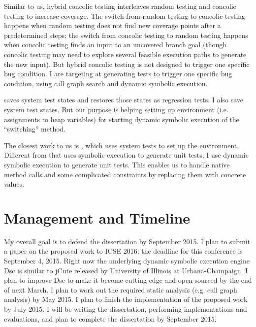 \documentclass[proposal]{umthesis} %
\begin{document}
Similar to us, hybrid concolic testing\cite{Majumdar:2007:HCT:1248820.1248874} interleaves random testing and concolic testing to increase coverage.  The switch from random testing to concolic testing happens when random testing does not find new coverage points after a predetermined steps; the switch from concolic testing to random testing happens when concolic testing finds an input to an uncovered branch goal (though concolic testing may need to explore several feasible execution paths to generate the new input).  But hybrid concolic testing is not designed to trigger one specific bug condition.  I are targeting at generating tests to trigger one specific bug condition, using call graph search and dynamic symbolic execution. 

\cite{Elbaum:2006:CDU:1181775.1181806} saves system test states and restores those states as regression tests.  I also save system test states.  But our purpose is helping setting up environment (i.e. assignments to heap variables) for starting dynamic symbolic execution of the “switching” method.

The closest work to us is \cite{Pasareanu:2008:CUS:1390630.1390635}, which uses system tests to set up the environment.  Different from\cite{Pasareanu:2008:CUS:1390630.1390635} that uses symbolic execution to generate unit tests, I use dynamic symbolic execution to generate unit tests.  This enables us to handle native method calls and some complicated constraints by replacing them with concrete values. 

\chapter{Management and Timeline}
\label{chp:timeline}

My overall goal is to defend the dissertation by September 2015.  I plan to submit a paper on the proposed work to ICSE 2016; the deadline for this conference is September 4, 2015.  Right now the underlying dynamic symbolic execution engine Dsc\cite{islam10dsc+mock} is similar to jCute\cite{sen06cute} released by University of Illinois at Urbana-Champaign. I plan to improve Dsc to make it become cutting-edge and open-sourced by the end of next March.  I plan to work out the required static analysis (e.g. call graph analysis) by May 2015.  I plan to finish the implementation of the proposed work by July 2015.  I will be writing the dissertation, performing implementations and evaluations, and plan to complete the dissertation by September 2015. 






\medskip

\end{document}
